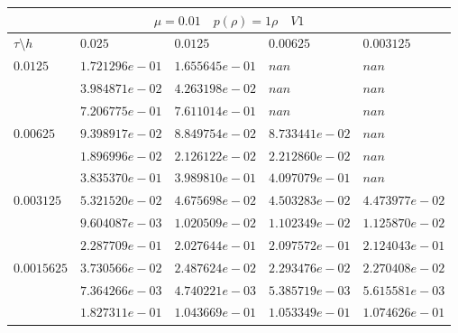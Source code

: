 \documentclass[a4paper,12pt]{extarticle}
\begin{document}
\begin{tabular}{|l|l|l|l|l|}
	\hline
	\multicolumn{5}{|c|}{$\mu =0.01 \quad  p(\rho) =1 \rho \quad V1$}\\
	\hline
	$\tau\setminus h$ & $0.025$ & $0.0125$ & $0.00625$ & $0.003125$\\
	\hline
	$0.0125$  & $1.721296e-01$ & $1.655645e-01$ & $nan$ & $nan$\\
	& $3.984871e-02$ & $4.263198e-02$ & $nan$ & $nan$\\
	& $7.206775e-01$ & $7.611014e-01$ & $nan$ & $nan$\\
	\hline
	$0.00625$  & $9.398917e-02$ & $8.849754e-02$ & $8.733441e-02$ & $nan$\\
	& $1.896996e-02$ & $2.126122e-02$ & $2.212860e-02$ & $nan$\\
	& $3.835370e-01$ & $3.989810e-01$ & $4.097079e-01$ & $nan$\\
	\hline
	$0.003125$  & $5.321520e-02$ & $4.675698e-02$ & $4.503283e-02$ & $4.473977e-02$\\
	& $9.604087e-03$ & $1.020509e-02$ & $1.102349e-02$ & $1.125870e-02$\\
	& $2.287709e-01$ & $2.027644e-01$ & $2.097572e-01$ & $2.124043e-01$\\
	\hline
	$0.0015625$  & $3.730566e-02$ & $2.487624e-02$ & $2.293476e-02$ & $2.270408e-02$\\
	& $7.364266e-03$ & $4.740221e-03$ & $5.385719e-03$ & $5.615581e-03$\\
	& $1.827311e-01$ & $1.043669e-01$ & $1.053349e-01$ & $1.074626e-01$\\
	\hline
\end{tabular}
\end{document}
